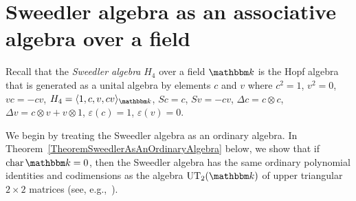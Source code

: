 \documentclass[12pt, reqno, a4paper]{amsart}
\theoremstyle{plain}
\theoremstyle{remark}
\theoremstyle{definition}
\numberwithin{equation}{section}
\DeclareMathOperator{\ch}{char}
\begin{document}
\section{Sweedler algebra as an associative algebra over a field}\label{SectionSweedlerAsAnOrdinaryAlgebra}

Recall that the \textit{Sweedler algebra} $H_4$ over a field $\mathbbm k$ is the Hopf algebra that is generated as a unital algebra by elements $c$ and $v$ where $c^2=1$, $v^2=0$, $vc=-cv$, $H_4 = \langle 1, c, v, cv \rangle_{\mathbbm k}$, $Sc=c$, $Sv=-cv$, $\Delta c = c\otimes c$, $\Delta v = c\otimes v + v\otimes 1$,
$\varepsilon(c)=1$, $\varepsilon(v)=0$.

We begin by treating the Sweedler algebra as an ordinary algebra.
In Theorem~\ref{TheoremSweedlerAsAnOrdinaryAlgebra} below, we show that if $\ch \mathbbm k = 0$, then the Sweedler algebra has the same ordinary polynomial identities and codimensions as the algebra 
$\mathrm{UT}_2(\mathbbm k)$ of upper triangular $2\times 2$ matrices (see, e.g.,~\cite[Theorem 4.1.5]{GiaZai}).
\end{document}
